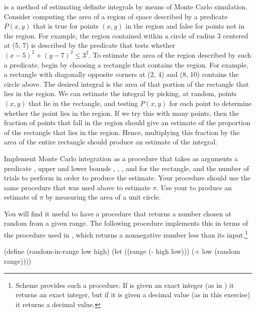\begin{exerciseGroup}
\label{Exercise 3.5}
 
is a method of estimating definite integrals by means of Monte Carlo
simulation.  Consider computing the area of a region of space described by a
predicate \( P(x, y) \) that is true for points \( (x, y) \) in the
region and false for points not in the region.  For example, the region
contained within a circle of radius 3 centered at (5, 7) is described by the
predicate that tests whether \( (x - 5)^2 + (y - 7)^2 \le 3^2 \).  To estimate
the area of the region described by such a predicate, begin by choosing a
rectangle that contains the region.  For example, a rectangle with diagonally
opposite corners at (2, 4) and (8, 10) contains the circle above.  The desired
integral is the area of that portion of the rectangle that lies in the region.
We can estimate the integral by picking, at random, points \( (x, y) \) that
lie in the rectangle, and testing \( P(x, y) \) for each point to
determine whether the point lies in the region.  If we try this with many
points, then the fraction of points that fall in the region should give an
estimate of the proportion of the rectangle that lies in the region.  Hence,
multiplying this fraction by the area of the entire rectangle should produce an
estimate of the integral.

Implement Monte Carlo integration as a procedure  that
takes as arguments a predicate , upper and lower bounds ,
, , and  for the rectangle, and the number of trials
to perform in order to produce the estimate.  Your procedure should use the
same  procedure that was used above to estimate \( \pi \).
Use your  to produce an estimate of \( \pi \) by
measuring the area of a unit circle.

You will find it useful to have a procedure that returns a number chosen at
random from a given range.  The following  procedure
implements this in terms of the  procedure used in
, which returns a nonnegative number less than its
input.\footnote{ Scheme provides such a procedure.  If
 is given an exact integer (as in ) it returns
an exact integer, but if it is given a decimal value (as in this exercise) it
returns a decimal value.}

\begin{codeBlock}
(define (random-in-range low high)
  (let ((range (- high low)))
    (+ low (random range))))
\end{codeBlock}


\end{exerciseGroup}
